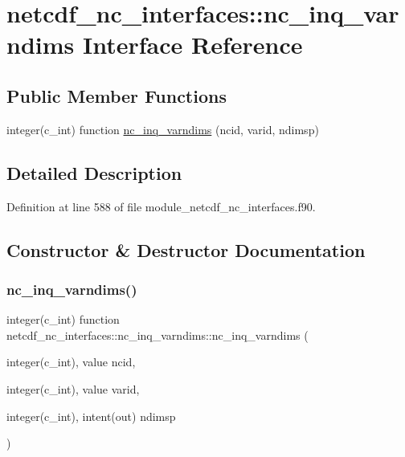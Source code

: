 \hypertarget{interfacenetcdf__nc__interfaces_1_1nc__inq__varndims}{}\section{netcdf\+\_\+nc\+\_\+interfaces\+:\+:nc\+\_\+inq\+\_\+varndims Interface Reference}
\label{interfacenetcdf__nc__interfaces_1_1nc__inq__varndims}
\subsection*{Public Member Functions}
\begin{DoxyCompactItemize}
\item 
integer(c\+\_\+int) function \hyperlink{interfacenetcdf__nc__interfaces_1_1nc__inq__varndims_ab4c512b94dbd096b146dcc3771aed80b}{nc\+\_\+inq\+\_\+varndims} (ncid, varid, ndimsp)
\end{DoxyCompactItemize}


\subsection{Detailed Description}


Definition at line 588 of file module\+\_\+netcdf\+\_\+nc\+\_\+interfaces.\+f90.



\subsection{Constructor \& Destructor Documentation}
\mbox{\label{interfacenetcdf__nc__interfaces_1_1nc__inq__varndims_ab4c512b94dbd096b146dcc3771aed80b}} 
\subsubsection{\texorpdfstring{nc\+\_\+inq\+\_\+varndims()}{nc\_inq\_varndims()}}
{\footnotesize\ttfamily integer(c\+\_\+int) function netcdf\+\_\+nc\+\_\+interfaces\+::nc\+\_\+inq\+\_\+varndims\+::nc\+\_\+inq\+\_\+varndims (\begin{DoxyParamCaption}\item[{integer(c\+\_\+int), value}]{ncid,  }\item[{integer(c\+\_\+int), value}]{varid,  }\item[{integer(c\+\_\+int), intent(out)}]{ndimsp }\end{DoxyParamCaption})}



